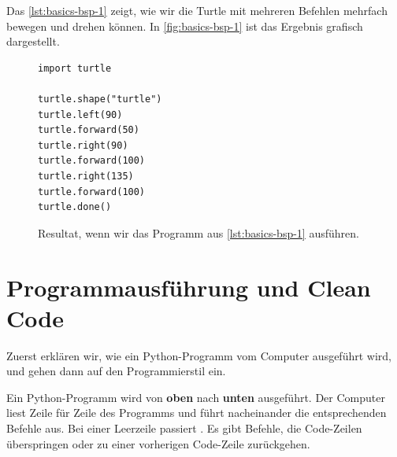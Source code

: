 \begin{example}

    Das \autoref{lst:basics-bsp-1} zeigt, wie wir die Turtle mit mehreren Befehlen mehrfach bewegen und drehen können.
    In \autoref{fig:basics-bsp-1} ist das Ergebnis grafisch dargestellt.

    \begin{figure}[htb]
        \centering
        \begin{minipage}{0.5\linewidth}
            \centering
            \begin{lstlisting}[language={python3}, caption={Beispielprogramm, welches die Figur aus \autoref{fig:basics-bsp-1} zeichnet (\graybgtexttt{bsp\_1.py}).}, label={lst:basics-bsp-1}]
import turtle

turtle.shape("turtle")
turtle.left(90)
turtle.forward(50)
turtle.right(90)
turtle.forward(100)
turtle.right(135)
turtle.forward(100)
turtle.done()

\end{lstlisting}
    \end{minipage}
    \hfill
    \begin{minipage}[c]{0.4\linewidth}
        \centering
        \caption{Resultat, wenn wir das Programm aus \autoref{lst:basics-bsp-1} ausführen.}
        \label{fig:basics-bsp-1}
    \end{minipage}
\end{figure}

\end{example}

\section{Programmausführung und Clean Code}

Zuerst erklären wir, wie ein Python-Programm vom Computer ausgeführt wird, und gehen dann auf den Programmierstil ein.

\begin{definition}[Programmausführung]
Ein Python-Programm wird von \textbf{oben} nach \textbf{unten} ausgeführt. Der Computer liest Zeile für Zeile des Programms und führt nacheinander die entsprechenden Befehle aus. Bei einer Leerzeile passiert . Es gibt Befehle, die Code-Zeilen überspringen oder zu einer vorherigen Code-Zeile zurückgehen.
\end{definition}

